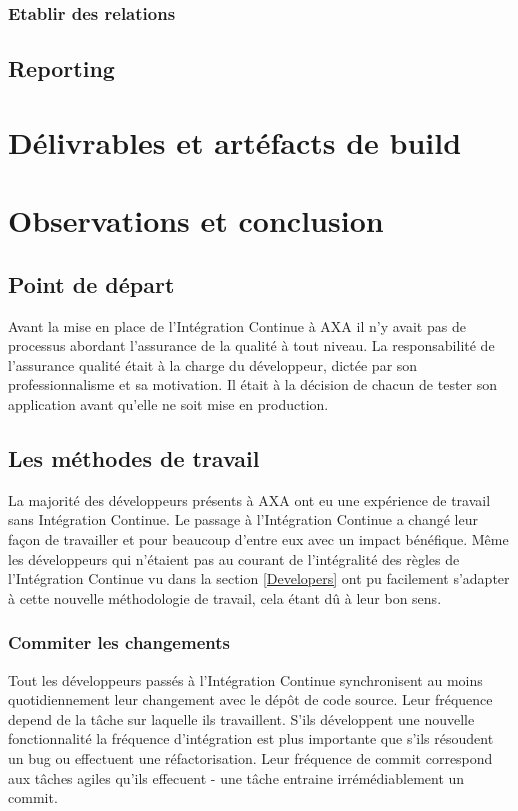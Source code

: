       \subsubsection{Etablir des relations}

    \subsection{Reporting}

  \section{Délivrables et artéfacts de build}

  \section{Observations et conclusion}
    \subsection{Point de départ}
    Avant la mise en place de l'Intégration Continue à AXA il n'y avait pas de processus abordant l'assurance de la qualité à tout niveau. La responsabilité de l'assurance qualité était à la charge du développeur, dictée par son professionnalisme et sa motivation. Il était à la décision de chacun de tester son application avant qu'elle ne soit mise en production. \\

    \subsection{Les méthodes de travail}
    La majorité des développeurs présents à AXA ont eu une expérience de travail sans Intégration Continue. Le passage à l'Intégration Continue a changé leur façon de travailler et pour beaucoup d'entre eux avec un impact bénéfique. Même les développeurs qui n'étaient pas au courant de l'intégralité des règles de l'Intégration Continue vu dans la section \ref{Developers} ont pu facilement s'adapter à cette nouvelle méthodologie de travail, cela étant dû à leur bon sens.

      \subsubsection{Commiter les changements}
      Tout les développeurs passés à l'Intégration Continue synchronisent au moins quotidiennement leur changement avec le dépôt de code source. Leur fréquence depend de la tâche sur laquelle ils travaillent. S'ils développent une nouvelle fonctionnalité la fréquence d'intégration est plus importante que s'ils résoudent un bug ou effectuent une réfactorisation. Leur fréquence de commit correspond aux tâches agiles qu'ils effecuent - une tâche entraine irrémédiablement un commit.

